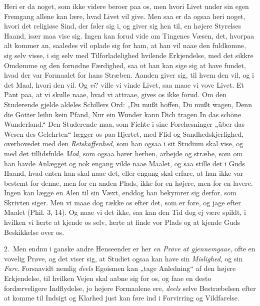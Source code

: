 \documentclass[12pt,a4paper]{book}
\newcommand{\apage}[1]{\marginnote{\footnotesize\textit{[#1]}}}
\begin{document}
Heri er da noget, som ikke videre beroer paa os, men hvori Livet under sin egen
Fremgang allene kan lære, hvad Livet vil give. Men saa er da ogsaa heri noget,
hvori det religiøse Sind, der føler sig i, og giver sig hen til, en højere
Styrelses Haand, især maa vise sig. Ingen kan forud vide om Tingenes Væsen, det,
hvorpaa alt kommer an, saaledes vil oplade sig for ham, at han vil naae den
fuldkomne, sig selv visse, i sig selv med Tilforladelighed hvilende Erkjendelse,
med det sikkre Omdømme og den fornødne  \apage{174} Færdighed, saa ot han kan sige sig at have
fundet, hvad der var Formaalet for hans Stræben. Aanden giver sig, til hvem den
vil, og i det Maal, hvori den vil. Og \emph{vi}? ville vi vinde Livet, saa maae vi vove
Livet. Et Pant paa, at vi skulle naae, hvad vi attraae, gives os ikke forud. Om
den Studerende gjelde aldeles Schillers Ord: „Du mußt hoffen, Du mußt wagen, Denn
die Götter leihn kein Pfand, Nur ein Wunder kann Dich tragen In das schöne
Wunderland.“ Den Studerende maa, som Fichte i sine Forelæsninger „über das Wesen
des Gelehrten“ lægger os paa Hjertet, med Flid og Sandhedskjerlighed, overhovedet
med den \emph{Retskaffenhed}, som han ogsaa i sit Studium skal vise, og med det
tillidsfulde \emph{Mod}, som ogsaa hører herhen, arbejde og stræbe, som om han havde
Anlægget og nok engang vilde naae Maalet, og saa stille det i Guds Haand, hvad
enten han skal naae det, eller engang skal erfare, at han ikke var bestemt for
denne, men for en anden Plads, ikke for en højere, men for en lavere. Ingen kan
lægge en Alen til sin Væxt, enddog han bekymrer sig derfor, som Skrivten siger. Men
vi maae dog række os efter det, som er fore, og jage efter Maalet (Phil. 3, 14).
Og naae vi det ikke, saa kan den Tid dog ej være spildt, i hvilken vi lærte at
kjende os selv, lærte at finde vor Plads og at kjende Guds Beskikkelse over os.

\apage{175} 2.~Men endnu i ganske andre Henseender er her \emph{en Prøve at gjennemgaae}, ofte en
vovelig Prøve, og det viser sig, at Studiet ogsaa kan have sin \emph{Mislighed}, og
sin \emph{Fare}. Forsaavidt nemlig \emph{deels} Egoismen kan „tage Anledning“ af den højere
Erkjendelse, til hvilken Vejen skal aabne sig for os, og faae en desto
fordærveligere Indflydelse, jo højere Formaalene ere, \emph{deels} selve Bestræbelsen
efter at komme til Indsigt og Klarhed just kan føre ind i Forvirring og
Vildfarelse.
\end{document}
